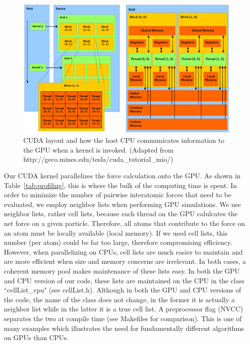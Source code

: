 \documentclass[12pt]{article}
\begin{document}
\begin{figure}[H]
   	\includegraphics[width=\textwidth]{gpu2.png}
	\caption{CUDA layout and how the host CPU communicates information to the GPU when a kernel is invoked. (Adapted from http://geco.mines.edu/tesla/cuda\_tutorial\_mio/)}
	\label{fig:cuda}
\end{figure}

Our CUDA kernel parallelizes the force calculation onto the GPU.  As shown in Table~\ref{tab:profiling}, this is where the bulk of the computing time is spent.  In order to minimize the number of pairwise interatomic forces that need to be evaluated, we employ neighbor lists when performing GPU simulations.  We use neighbor lists, rather cell lists, because each thread on the GPU calulcates the net force on a given particle.  Therefore, all atoms that contribute to the force on an atom must be locally available (local memory).  If we used cell lists, this number (per atom) could be far too large, therefore compromising efficiency.  However, when parallelizing on CPUs, cell lists are much easier to maintain and are more efficient when size and memory concerns are irrelevant.  In both cases, a coherent memory pool makes maintenance of these lists easy. In both the GPU and CPU version of our code, these lists are maintained on the CPU in the class ``cellList\_cpu" (see cellList.h).  Although in both the GPU and CPU versions of the code, the name of the class does not change, in the former it is actually a neighbor list while in the latter it is a true cell list.  A preprocessor flag (NVCC) separates the two at compile time (see Makefiles for comparison).  This is one of many examples which illustrates the need for fundamentally different algorithms on GPUs than CPUs.
\end{document}
